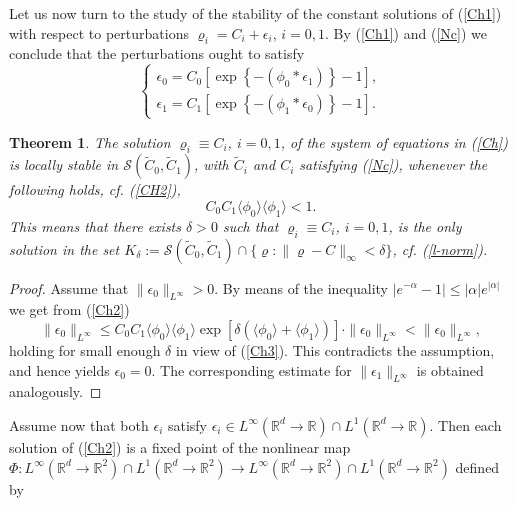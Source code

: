 \documentclass[reqno,11pt]{amsart}
\newtheorem{theorem}{Theorem}[section]
\theoremstyle{definition}
\theoremstyle{remark}
\numberwithin{equation}{section}
\begin{document}
Let us now turn to the study of the stability of the constant
solutions of (\ref{Ch1}) with respect to perturbations $\varrho_i =
C_i + \epsilon_i$, $i=0,1$. By (\ref{Ch1}) and (\ref{Nc}) we
conclude that the perturbations ought to satisfy
\begin{equation}
  \label{Ch2}
\left\{\begin{array}{l} \epsilon_0 = C_0\left[ \exp\left\{-\left(
\phi_0 \ast  \epsilon_{1} \right) \right\} -1 \right], \\[.2cm] \epsilon_1 = C_1 \left[\exp\left\{-\left(
\phi_1 \ast \epsilon_{0} \right) \right\} -1 \right].
\end{array} \right.
\end{equation}
\begin{theorem}
  \label{K1tm}
The solution $\varrho_i\equiv  C_i$, $i=0,1$, of the system of
equations in (\ref{Ch}) is locally stable in
$\mathcal{S}(\widetilde{C}_0, \widetilde{C}_1)$, with
$\widetilde{C}_i$ and $C_i$ satisfying (\ref{Nc}), whenever the
following holds, cf. (\ref{CH2}),
\begin{equation}
  \label{Ch3}
C_0 C_1 \langle \phi_0 \rangle \langle \phi_1 \rangle < 1.
\end{equation}
This means that  there exists $\delta
>0$ such that $\varrho_i\equiv C_i$, $i=0,1$, is the only solution in the set $K_\delta:= \mathcal{S}(\widetilde{C}_0,
\widetilde{C}_1) \cap \{\varrho: \|\varrho-C\|_{\infty} < \delta\}$,
cf. (\ref{l-norm}).
\end{theorem}
\begin{proof}
Assume that $\|\epsilon_0\|_{L^\infty} >0$.  By means of the
inequality $|e^{-\alpha}-1| \leq |\alpha|e^{|\alpha|}$ we get from
(\ref{Ch2})
\[
\|\epsilon_0\|_{L^\infty} \leq  C_0 C_1 \langle \phi_0 \rangle
\langle \phi_1 \rangle \exp\left[\delta\left( \langle \phi_0 \rangle
+ \langle \phi_1 \rangle\right)\right]\cdot
\|\epsilon_0\|_{L^\infty} < \|\epsilon_0\|_{L^\infty},
\]
holding for small enough $\delta$ in view of (\ref{Ch3}). This
contradicts the assumption, and hence yields $\epsilon_0 =0$. The
corresponding estimate for $\|\epsilon_1\|_{L^\infty}$ is obtained
analogously.
\end{proof}
Assume now that both $\epsilon_i$  satisfy $\epsilon_i \in L^\infty
(\mathds{R}^d\to \mathds{R})\cap  L^1 (\mathds{R}^d\to \mathds{R})$.
Then each solution of (\ref{Ch2}) is a fixed point of the nonlinear
map $\Phi:L^\infty (\mathds{R}^d\to \mathds{R}^2)\cap L^1
(\mathds{R}^d\to \mathds{R}^2) \to L^\infty (\mathds{R}^d\to
\mathds{R}^2)\cap L^1 (\mathds{R}^d\to \mathds{R}^2) $ defined by
\end{document}
